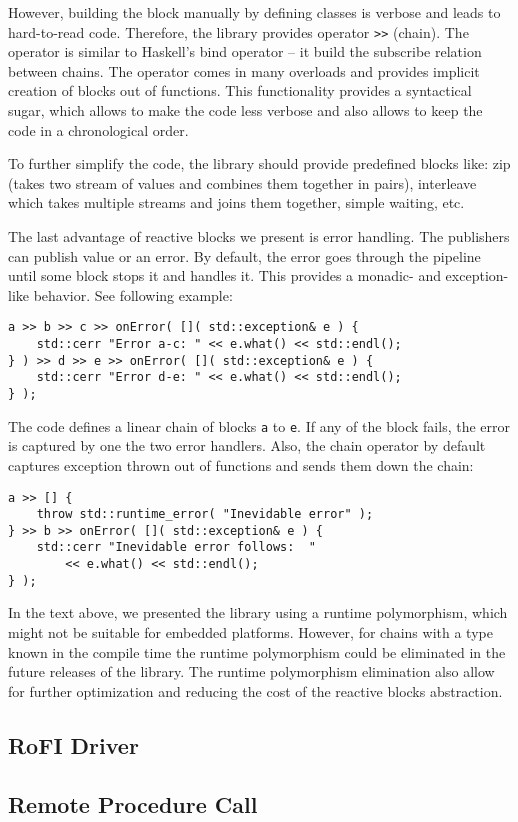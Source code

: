However, building the block manually by defining classes is verbose and leads to
hard-to-read code. Therefore, the library provides operator
\texttt{>>} (chain). The operator is similar to Haskell's
bind operator -- it build the subscribe relation between chains. The operator
comes in many overloads and provides implicit creation of blocks out of
functions. This functionality provides a syntactical sugar, which allows to make
the code less verbose and also allows to keep the code in a chronological order.

To further simplify the code, the library should provide predefined blocks like:
zip (takes two stream of values and combines them together in pairs), interleave
which takes multiple streams and joins them together, simple waiting, etc.

The last advantage of reactive blocks we present is error handling. The
publishers can publish value or an error. By default, the error goes through the
pipeline until some block stops it and handles it. This provides a monadic- and
exception-like behavior. See following example:
\begin{verbatim}
a >> b >> c >> onError( []( std::exception& e ) {
    std::cerr "Error a-c: " << e.what() << std::endl();
} ) >> d >> e >> onError( []( std::exception& e ) {
    std::cerr "Error d-e: " << e.what() << std::endl();
} );
\end{verbatim}
The code defines a linear chain of blocks \texttt{a} to \texttt{e}. If any of
the block fails, the error is captured by one the two error handlers. Also, the
chain operator by default captures exception thrown out of functions and sends
them down the chain:
\begin{verbatim}
a >> [] {
    throw std::runtime_error( "Inevidable error" );
} >> b >> onError( []( std::exception& e ) {
    std::cerr "Inevidable error follows:  "
        << e.what() << std::endl();
} );
\end{verbatim}

In the text above, we presented the library using a runtime polymorphism, which
might not be suitable for embedded platforms. However, for chains with a type
known in the compile time the runtime polymorphism could be eliminated in the
future releases of the library. The runtime polymorphism elimination also allow
for further optimization and reducing the cost of the reactive blocks
abstraction.

\subsection{RoFI Driver}

\subsection{Remote Procedure Call}